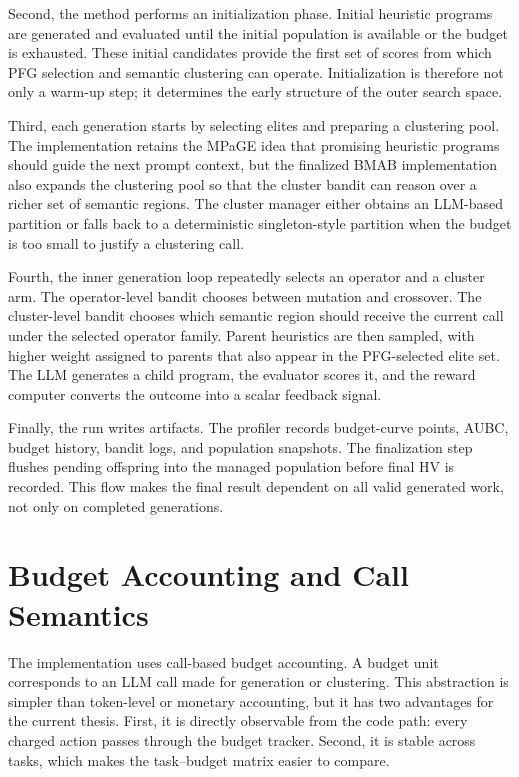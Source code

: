 \documentclass[../main.tex]{subfiles}
\begin{document}
Second, the method performs an initialization phase. Initial heuristic programs are generated and evaluated until the initial population is available or the budget is exhausted. These initial candidates provide the first set of scores from which PFG selection and semantic clustering can operate. Initialization is therefore not only a warm-up step; it determines the early structure of the outer search space.

Third, each generation starts by selecting elites and preparing a clustering pool. The implementation retains the MPaGE idea that promising heuristic programs should guide the next prompt context, but the finalized BMAB implementation also expands the clustering pool so that the cluster bandit can reason over a richer set of semantic regions. The cluster manager either obtains an LLM-based partition or falls back to a deterministic singleton-style partition when the budget is too small to justify a clustering call.

Fourth, the inner generation loop repeatedly selects an operator and a cluster arm. The operator-level bandit chooses between mutation and crossover. The cluster-level bandit chooses which semantic region should receive the current call under the selected operator family. Parent heuristics are then sampled, with higher weight assigned to parents that also appear in the PFG-selected elite set. The LLM generates a child program, the evaluator scores it, and the reward computer converts the outcome into a scalar feedback signal.

Finally, the run writes artifacts. The profiler records budget-curve points, AUBC, budget history, bandit logs, and population snapshots. The finalization step flushes pending offspring into the managed population before final HV is recorded. This flow makes the final result dependent on all valid generated work, not only on completed generations.

\section{Budget Accounting and Call Semantics}

The implementation uses call-based budget accounting. A budget unit corresponds to an LLM call made for generation or clustering. This abstraction is simpler than token-level or monetary accounting, but it has two advantages for the current thesis. First, it is directly observable from the code path: every charged action passes through the budget tracker. Second, it is stable across tasks, which makes the task--budget matrix easier to compare.
\end{document}
